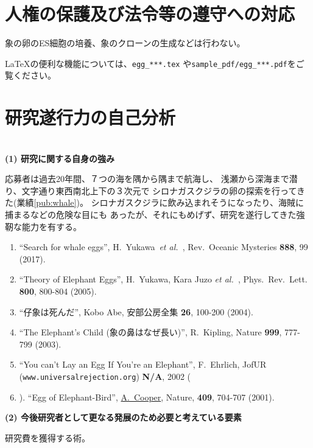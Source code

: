 \documentclass[11pt,a4j,dvipdfmx]{jarticle} 					%
\newcommand{\研究課題名}{象の卵}
\newcommand{\研究機関名}{逢坂大学}
\newcommand{\研究代表者氏名}{湯川秀樹}
\newcommand{\paper}[6]{%
	\item ``#1'', #2, #3 {\bf #4}, #5 (#6).			%
}
\newcommand{\etal}{\textit{et al.\ }}
\newcommand{\yukawa}{H.~Yukawa}					%
\newcommand{\prl}{Phys.\ Rev.\ Lett.\ }		%
\begin{document}



\section{人権の保護及び法令等の遵守への対応}

	象の卵のES細胞の培養、象のクローンの生成などは行わない。

	\LaTeX の便利な機能については、\texttt{egg\_***.tex} や\texttt{sample\_pdf/egg\_***.pdf}をご覧ください。




\section{研究遂行力の自己分析}

\DCPDInstructionsA\\%
\noindent
\textbf{(1) 研究に関する自身の強み}
\DCPDInstructionsB%

	応募者は過去20年間、７つの海を隅から隅まで航海し、
	浅瀬から深海まで潜り、文字通り東西南北上下の３次元で
	シロナガスクジラの卵の探索を行ってきた(業績\ref{pub:whale})。
	シロナガスクジラに飲み込まれそうになったり、海賊に捕まるなどの危険な目にも
	あったが、それにもめげず、研究を遂行してきた強靭な能力を有する。
	\begin{enumerate}
		\paper{Search for whale eggs}{\yukawa\ \etal}{Rev.\ Oceanic Mysteries}{888}{99}{2017}
			\label{pub:whale}
				
		\paper{Theory of Elephant Eggs}{\yukawa, Kara Juzo \etal}{\prl}{800}{800-804}{2005}
			\label{pub:theoegg}
				
		\paper{仔象は死んだ}{Kobo Abe}{安部公房全集}{26}{100-200}{2004}
		
		\paper{The Elephant's Child (象の鼻はなぜ長い)}{R.~Kipling}{Nature}{999}{777-799}{2003}

		\paper{You can't Lay an Egg If You're an Elephant}{F.~Ehrlich}
			{JofUR\\({\tt www.universalrejection.org})}{{\bf N/A}}{2002}
		
		\item ``Egg of Elephant-Bird'', 
				\underline{A.~Cooper},
				Nature, {\bf 409}, 704-707 (2001).	%
	\end{enumerate}
\vspace{5mm}
\noindent
\textbf{(2) 今後研究者として更なる発展のため必要と考えている要素}

研究費を獲得する術。




\end{document}
